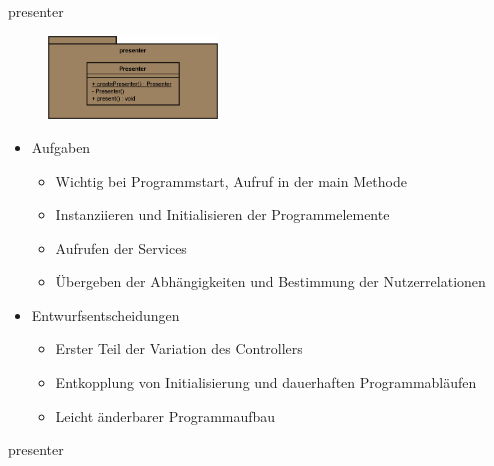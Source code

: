 \begin{frame}{presenter}
  \begin{figure}
    \centering
    \includegraphics[width=0.4\textwidth]{./images/presenter.png}
  \end{figure}
  \begin{itemize}[<+->]
    \item Aufgaben
      \begin{itemize}
        \item Wichtig bei Programmstart, Aufruf in der main Methode
        \item Instanziieren und Initialisieren der Programmelemente
        \item Aufrufen der Services
        \item Übergeben der Abhängigkeiten und Bestimmung der Nutzerrelationen
      \end{itemize}
      \item Entwurfsentscheidungen
        \begin{itemize}
          \item Erster Teil der Variation des Controllers
          \item Entkopplung von Initialisierung und dauerhaften Programmabläufen
          \item Leicht änderbarer Programmaufbau
        \end{itemize}
  \end{itemize}
\end{frame}

\begin{frame}{presenter}

\end{frame} 
